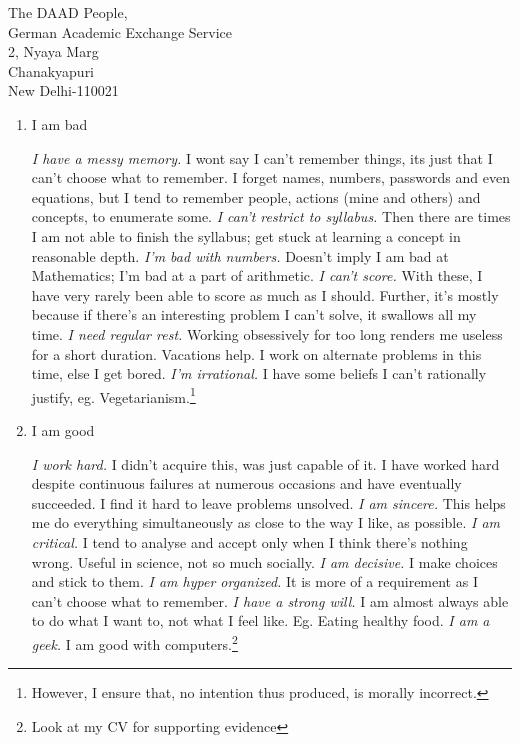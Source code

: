 \documentclass{letter}
\begin{document}
\begin{letter}{The DAAD People,\\German Academic Exchange Service\\2, Nyaya Marg\\Chanakyapuri\\New Delhi-110021}
\begin{enumerate}
\emph{I am focussed.} Quantum Computing, revolutionary as it is, stands at the bleeding edge of physics, mathematics and engineering, the fields closest to my heart. I am interested in looking at the theoretical and practical difficulties of building such a device, specifically with the problems of de-coherence and memory cloning. At this stage I don't know enough, however I am actively learning all the physics necessary, with as much depth as I can, so that my tools are sharp enough to attack the problem when its project time.


\item I am bad

\emph{I have a messy memory.} I wont say I can't remember things, its just that I can't choose what to remember. I forget names, numbers, passwords and even equations, but I tend to remember people, actions (mine and others) and concepts, to enumerate some.
\emph{I can't restrict to syllabus.} Then there are times I am not able to finish the syllabus; get stuck at learning a concept in reasonable depth.
\emph{I'm bad with numbers.} Doesn't imply I am bad at Mathematics; I'm bad at a part of arithmetic.
\emph{I can't score.} With these, I have very rarely been able to score as much as I should. Further, it's mostly because if there's an interesting problem I can't solve, it swallows all my time. 
\emph{I need regular rest.} Working obsessively for too long renders me useless for a short duration. Vacations help. I work on alternate problems in this time, else I get bored.
\emph{I'm irrational.} I have some beliefs I can't rationally justify, eg. Vegetarianism.\footnote{However, I ensure that, no intention thus produced, is morally incorrect.}

\item I am good

\emph{I work hard.} I didn't acquire this, was just capable of it. I have worked hard despite continuous failures at numerous occasions and have eventually succeeded. I find it hard to leave problems unsolved.
\emph{I am sincere.} This helps me do everything simultaneously as close to the way I like, as possible.
\emph{I am critical.} I tend to analyse and accept only when I think there's nothing wrong. Useful in science, not so much socially.
\emph{I am decisive.} I make choices and stick to them.
\emph{I am hyper organized.} It is more of a requirement as I can't choose what to remember.
\emph{I have a strong will.} I am almost always able to do what I want to, not what I feel like. Eg. Eating healthy food.
\emph{I am a geek.} I am good with computers.\footnote{Look at my CV for supporting evidence}



\end{enumerate}
\end{letter}
\end{document}
